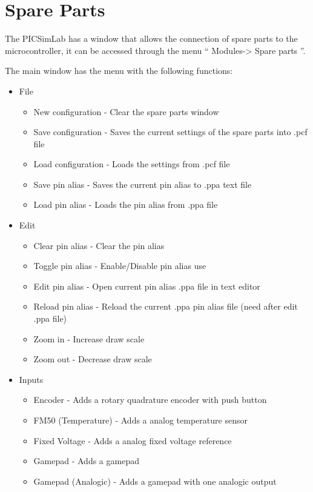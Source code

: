 

\chapter{Spare Parts} \hypertarget{def:spare}{}

The PICSimLab has a window that allows the connection of spare parts to the microcontroller, it can be accessed through the menu `` Modules-> Spare parts ''.

The main window has the menu with the following functions:
\begin{itemize}
 \item File
 \begin{itemize}
 \item New configuration - Clear the spare parts window 
 \item Save configuration - Saves the current settings of the spare parts into .pcf file
 \item Load configuration - Loads the settings from .pcf file
 \item Save pin alias - Saves the current pin alias to .ppa text file
 \item Load pin alias - Loads the pin alias from .ppa file
\end{itemize}
 \item Edit
 \begin{itemize}
 \item Clear pin alias - Clear the pin alias 
 \item Toggle pin alias - Enable/Disable pin alias use
 \item Edit pin alias - Open current pin alias .ppa file in text editor
 \item Reload pin alias - Reload the current .ppa pin alias file (need after edit .ppa file) 
 \item Zoom in - Increase draw scale
 \item Zoom out - Decrease draw scale
\end{itemize}
 \item Inputs
 \begin{itemize}
  \item Encoder - Adds a rotary quadrature encoder with push button
  \item FM50 (Temperature) - Adds a analog temperature sensor
  \item Fixed Voltage -  Adds a analog fixed voltage reference
  \item Gamepad - Adds a gamepad
  \item Gamepad (Analogic) - Adds a gamepad with one analogic output 

\end{itemize}
\end{itemize}
